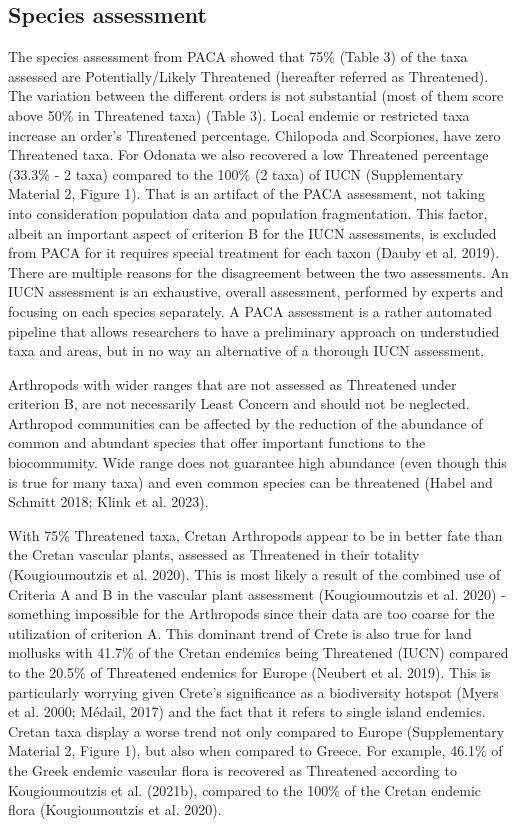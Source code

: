     \subsection{Species assessment}
    \label{subsec:arthropods-species-assessment-disc}

The species assessment from PACA showed that 75\% (Table 3) of the
taxa assessed are Potentially/Likely Threatened (hereafter referred as Threatened).
The variation between the different orders is not substantial (most of them
score above 50\% in Threatened taxa) (Table 3). Local endemic or restricted taxa
increase an order’s Threatened percentage. Chilopoda and Scorpiones, have zero
Threatened taxa. For Odonata we also recovered a low Threatened percentage
(33.3\% - 2 taxa) compared to the 100\% (2 taxa) of IUCN
(Supplementary Material 2, Figure 1). That is an artifact of the PACA
assessment, not taking into consideration population data and population
fragmentation. This factor, albeit an important aspect of criterion B for the
IUCN assessments, is excluded from PACA for it requires special treatment for
each taxon (Dauby et al. 2019). There are multiple reasons for the disagreement
between the two assessments. An IUCN assessment is an exhaustive, overall
assessment, performed by experts and focusing on each species separately.
A PACA assessment is a rather automated pipeline that allows researchers to
have a preliminary approach on understudied taxa and areas, but in no way an
alternative of a thorough IUCN assessment.

Arthropods with wider ranges that are not assessed as Threatened under
criterion B, are not necessarily Least Concern and should not be neglected.
Arthropod communities can be affected by the reduction of the abundance of
common and abundant species that offer important functions to the biocommunity.
Wide range does not guarantee high abundance (even though this is true for many
taxa) and even common species can be threatened (Habel and Schmitt 2018; Klink et al. 2023).

With 75\% Threatened taxa, Cretan Arthropods appear to be in better fate than
the Cretan vascular plants, assessed as Threatened in their totality
(Kougioumoutzis et al. 2020). This is most likely a result of the combined use
of Criteria A and B in the vascular plant assessment (Kougioumoutzis et al. 2020) -
something impossible for the Arthropods since their data are too coarse for the
utilization of criterion A. This dominant trend of Crete is also true for land
mollusks with 41.7\% of the Cretan endemics being Threatened (IUCN) compared to
the 20.5\% of Threatened endemics for Europe (Neubert et al. 2019). This is
particularly worrying given Crete’s significance as a biodiversity
hotspot (Myers et al. 2000; Médail, 2017) and the fact that it refers to single
island endemics. Cretan taxa display a worse trend not only compared to Europe (Supplementary Material 2, Figure 1),
but also when compared to Greece. For example, 46.1\% of the Greek endemic
vascular flora is recovered as Threatened according to Kougioumoutzis et al. (2021b),
compared to the 100\% of the Cretan endemic flora (Kougioumoutzis et al. 2020). 
    
